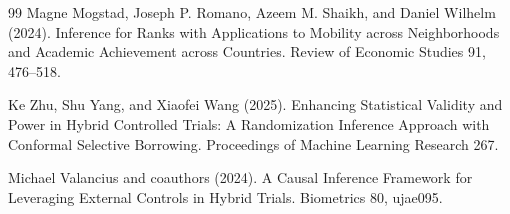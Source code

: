 \documentclass{article}
\begin{document}
\begin{thebibliography}{99}
   Magne Mogstad, Joseph P. Romano, Azeem M. Shaikh, and Daniel Wilhelm (2024). Inference for Ranks with Applications to Mobility across Neighborhoods and Academic Achievement across Countries. Review of Economic Studies 91, 476--518.

   Ke Zhu, Shu Yang, and Xiaofei Wang (2025). Enhancing Statistical Validity and Power in Hybrid Controlled Trials: A Randomization Inference Approach with Conformal Selective Borrowing. Proceedings of Machine Learning Research 267.

   Michael Valancius and coauthors (2024). A Causal Inference Framework for Leveraging External Controls in Hybrid Trials. Biometrics 80, ujae095.

\end{thebibliography}
\end{document}
